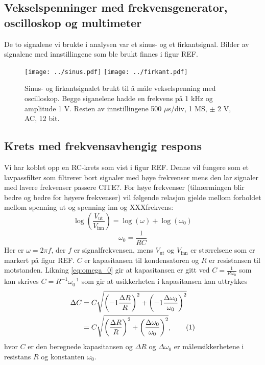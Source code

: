 \documentclass[reprint, english,notitlepage]{revtex4-1}  %
\newcommand\numberthis{\addtocounter{equation}{1}\tag{\theequation}}
\begin{document}
\subsection{Vekselspenninger med frekvensgenerator, oscilloskop og multimeter}
De to signalene vi brukte i analysen var et sinus- og et firkantsignal. Bilder av signalene med innstillingene som ble brukt finnes i figur REF.

\begin{figure}
  \texttt{[image: ../sinus.pdf]}
  \texttt{[image: ../firkant.pdf]}
  \caption{Sinus- og firkantsignalet brukt til å måle vekselspenning med oscilloskop. Begge siganelene hadde en frekvens på 1 kHz og amplitude 1 V. Resten av innstillingene 500 $\mu$s/div, 1 MS, $\pm$ 2 V, AC, 12 bit.}
  \label{fig:sinussignal}
\end{figure}


\subsection{Krets med frekvensavhengig respons}
Vi har koblet opp en RC-krets som vist i figur REF. Denne vil fungere som et lavpassfilter som filtrerer bort signaler med høye frekvenser mens den lar signaler med lavere frekvenser passere CITE?. For høye frekvenser (tilnærmingen blir bedre og bedre for høyere frekvenser) vil følgende relasjon gjelde mellom forholdet mellom spenning ut og spenning inn og XXXfrekvens:
\begin{equation}
  \log \left( \frac{V_{\text{ut}}}{V_{\text{inn}}} \right) = \log (\omega) + \log (\omega_0) \label{eq:lavpass}
\end{equation}
\begin{equation}
  \omega_0 = \frac{1}{RC} \label{eq:omega_0}
\end{equation}
Her er $\omega = 2 \pi f$, der $f$ er signalfrekvensen, mens $V_{\text{ut}}$ og $V_{\text{inn}}$ er størrelsene som er markert på figur REF. $C$ er kapasitansen til kondensatoren og $R$ er resistansen til motstanden. Likning \ref{eq:omega_0} gir at kapasitansen er gitt ved $C = \frac{1}{R \omega_0}$ som kan skrives $C = R^{-1} \omega_0^{-1}$ som gir at usikkerheten i kapasitansen kan uttrykkes
\begin{align*}
  \Delta C &= C \sqrt{\left( -1 \frac{\Delta R}{R} \right) ^2 + \left( -1 \frac{\Delta \omega_0}{\omega_0} \right) ^2} \\
  &= C \sqrt{\left( \frac{\Delta R}{R} \right) ^2 + \left( \frac{\Delta \omega_0}{\omega_0} \right) ^2}, \numberthis \label{eq:usikkerhet_C}
\end{align*}
hvor $C$ er den beregnede kapasitansen og $\Delta R$ og $\Delta \omega_0$ er måleusikkerhetene i resistans $R$ og konstanten $\omega_0$.
\end{document}
